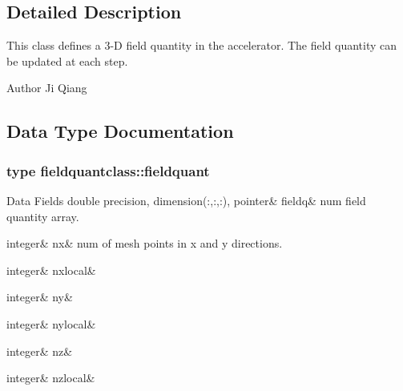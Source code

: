 \subsection{Detailed Description}
This class defines a 3-\/D field quantity in the accelerator. The field quantity can be updated at each step. 

\begin{DoxyAuthor}{Author}
Ji Qiang 
\end{DoxyAuthor}


\subsection{Data Type Documentation}
\label{structfieldquantclass_1_1fieldquant}
\subsubsection{type fieldquantclass\+::fieldquant}
\begin{DoxyFields}{Data Fields}
\mbox{\label{namespacefieldquantclass_a3d25be64f02ec3fd9be9700006e6e4f3}} 
double precision, dimension(:,:,:), pointer&
fieldq&
num field quantity array. \\
\hline

\mbox{\label{namespacefieldquantclass_a7e825dc6a0487f44528fad55e632cc70}} 
integer&
nx&
num of mesh points in x and y directions. \\
\hline

\mbox{\label{namespacefieldquantclass_a7caab2ebce71f57176a519933b7e2666}} 
integer&
nxlocal&
\\
\hline

\mbox{\label{namespacefieldquantclass_a400586052c8deb7240b215eee62b89e9}} 
integer&
ny&
\\
\hline

\mbox{\label{namespacefieldquantclass_a3c9290ff97ebcaf272c17ed3975a18e1}} 
integer&
nylocal&
\\
\hline

\mbox{\label{namespacefieldquantclass_a6f78161e325887e087580ad729a35d0b}} 
integer&
nz&
\\
\hline

\mbox{\label{namespacefieldquantclass_aa91a76fdf699b94c32a92a2b2fa2451d}} 
integer&
nzlocal&
\\
\hline

\end{DoxyFields}


